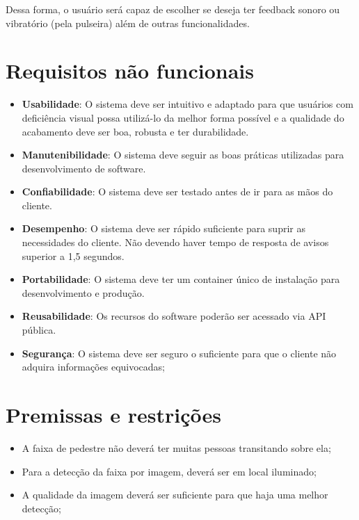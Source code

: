 Dessa forma, o usuário será capaz de escolher se deseja ter feedback sonoro ou vibratório (pela pulseira) além de outras funcionalidades.

\section{Requisitos não funcionais}

\begin{itemize}
    \item \textbf{Usabilidade}: O sistema deve ser intuitivo e adaptado para que usuários com deficiência visual possa utilizá-lo da melhor forma possível e a qualidade do acabamento deve ser boa, robusta e ter durabilidade.
    \item \textbf{Manutenibilidade}: O sistema deve seguir as boas práticas utilizadas para desenvolvimento de software.
    \item \textbf{Confiabilidade}: O sistema deve ser testado antes de ir para as mãos do cliente.
    \item \textbf{Desempenho}: O sistema deve ser rápido suficiente para suprir as necessidades do cliente. Não devendo haver tempo de resposta de avisos superior a 1,5 segundos.
    \item \textbf{Portabilidade}: O sistema deve ter um container único de instalação para desenvolvimento e produção.
    \item \textbf{Reusabilidade}: Os recursos do software poderão ser acessado via API pública.
    \item \textbf{Segurança}: O sistema deve ser seguro o suficiente para que o cliente não adquira informações equivocadas;
\end{itemize}

\section{Premissas e restrições}

\begin{itemize}
    \item A faixa de pedestre não deverá ter muitas pessoas transitando sobre ela;
    \item Para a detecção da faixa por imagem, deverá ser em local iluminado;
    \item A qualidade da imagem deverá ser suficiente para que haja uma melhor detecção;
\end{itemize}